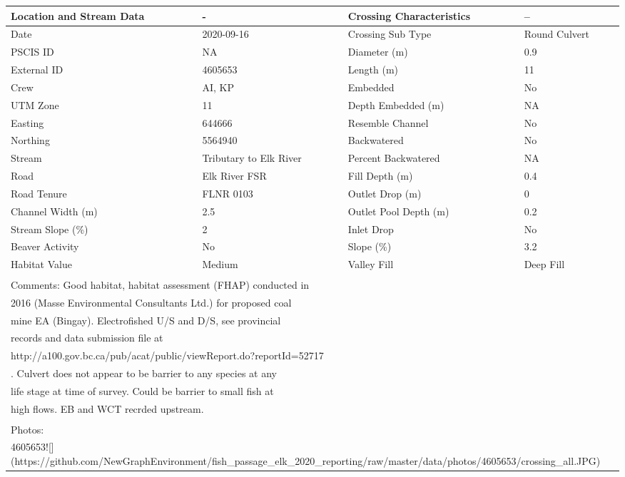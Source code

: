 \documentclass[
]{book}
\begin{document}
\begin{tabular}{l|l|l|l}
\hline
Location and Stream Data & - & Crossing Characteristics & --\\
\hline
Date & 2020-09-16 & Crossing Sub Type & Round Culvert\\
\hline
PSCIS ID & NA & Diameter (m) & 0.9\\
\hline
External ID & 4605653 & Length (m) & 11\\
\hline
Crew & AI, KP & Embedded & No\\
\hline
UTM Zone & 11 & Depth Embedded (m) & NA\\
\hline
Easting & 644666 & Resemble Channel & No\\
\hline
Northing & 5564940 & Backwatered & No\\
\hline
Stream & Tributary to Elk River & Percent Backwatered & NA\\
\hline
Road & Elk River FSR & Fill Depth (m) & 0.4\\
\hline
Road Tenure & FLNR 0103 & Outlet Drop (m) & 0\\
\hline
Channel Width (m) & 2.5 & Outlet Pool Depth (m) & 0.2\\
\hline
Stream Slope (\%) & 2 & Inlet Drop & No\\
\hline
Beaver Activity & No & Slope (\%) & 3.2\\
\hline
Habitat Value & Medium & Valley Fill & Deep Fill\\
\hline
\multicolumn{4}{l}{\textsuperscript{} Comments: Good habitat, habitat assessment (FHAP) conducted in}\\
\multicolumn{4}{l}{2016 (Masse Environmental Consultants Ltd.) for proposed coal}\\
\multicolumn{4}{l}{mine EA (Bingay). Electrofished U/S and D/S, see provincial}\\
\multicolumn{4}{l}{records and data submission file at}\\
\multicolumn{4}{l}{http://a100.gov.bc.ca/pub/acat/public/viewReport.do?reportId=52717}\\
\multicolumn{4}{l}{. Culvert does not appear to be barrier to any species at any}\\
\multicolumn{4}{l}{life stage at time of survey.  Could be barrier to small fish at}\\
\multicolumn{4}{l}{high flows. EB and WCT recrded upstream.}\\
\multicolumn{4}{l}{\textsuperscript{} Photos:}\\
\multicolumn{4}{l}{4605653![](https://github.com/NewGraphEnvironment/fish\_passage\_elk\_2020\_reporting/raw/master/data/photos/4605653/crossing\_all.JPG)}\\
\end{tabular}
\end{document}
